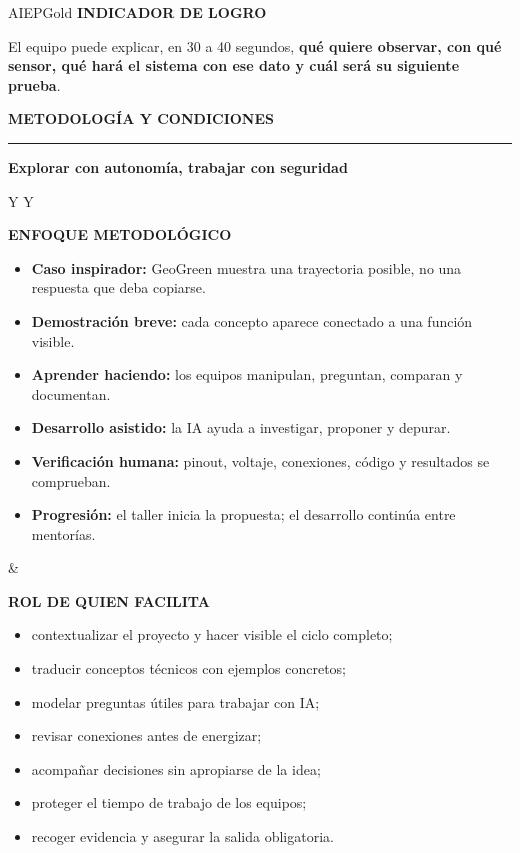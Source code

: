 \documentclass[10pt,a4paper]{article}
\newcommand{\kicker}[1]{%
  {\color{AIEPRed}\scriptsize\bfseries\MakeUppercase{#1}}\par\vspace{2.5mm}
  {\color{AIEPRed}\rule{13mm}{1.2pt}}\vspace{3mm}
}
\newcommand{\labeltext}[1]{%
  {\scriptsize\bfseries\color{AIEPSlate}\MakeUppercase{#1}}\par\vspace{1.2mm}
}
\begin{document}
\begin{softcard}{AIEPGold}
\labeltext{Indicador de logro}
El equipo puede explicar, en 30 a 40 segundos, \textbf{qué quiere observar, con qué sensor, qué hará
el sistema con ese dato y cuál será su siguiente prueba}.
\end{softcard}

\newpage
\kicker{Metodología y condiciones}
{\LARGE\bfseries\color{AIEPNavy}Explorar con autonomía, trabajar con seguridad}\par
\vspace{4mm}

\begin{tabularx}{\textwidth}{Y Y}
\begin{card}[height=73mm,valign=top]
\labeltext{Enfoque metodológico}
\begin{itemize}
  \item \textbf{Caso inspirador:} GeoGreen muestra una trayectoria posible, no una respuesta que deba copiarse.
  \item \textbf{Demostración breve:} cada concepto aparece conectado a una función visible.
  \item \textbf{Aprender haciendo:} los equipos manipulan, preguntan, comparan y documentan.
  \item \textbf{Desarrollo asistido:} la IA ayuda a investigar, proponer y depurar.
  \item \textbf{Verificación humana:} pinout, voltaje, conexiones, código y resultados se comprueban.
  \item \textbf{Progresión:} el taller inicia la propuesta; el desarrollo continúa entre mentorías.
\end{itemize}
\end{card}
&
\begin{card}[height=73mm,valign=top]
\labeltext{Rol de quien facilita}
\begin{itemize}
  \item contextualizar el proyecto y hacer visible el ciclo completo;
  \item traducir conceptos técnicos con ejemplos concretos;
  \item modelar preguntas útiles para trabajar con IA;
  \item revisar conexiones antes de energizar;
  \item acompañar decisiones sin apropiarse de la idea;
  \item proteger el tiempo de trabajo de los equipos;
  \item recoger evidencia y asegurar la salida obligatoria.
\end{itemize}
\end{card}
\end{tabularx}
\end{document}
